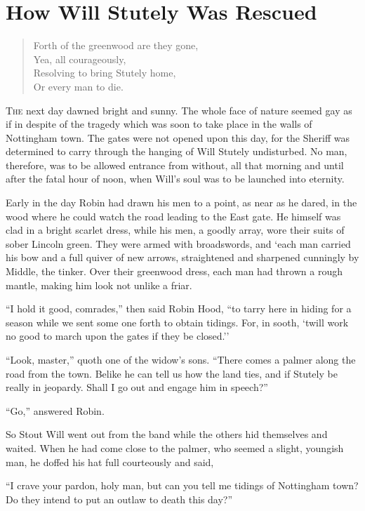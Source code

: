 \chapter{How Will Stutely Was Rescued}

\begin{quote}
Forth of the greenwood are they gone,\\
Yea, all courageously,\\
Resolving to bring Stutely home,\\
Or every man to die.
\end{quote}

\lettrine{T}{he} next day dawned bright and sunny. The whole face of nature seemed
gay as if in despite of the tragedy which was soon to take place in the
walls of Nottingham town. The gates were not opened upon this day, for
the Sheriff was determined to carry through the hanging of Will Stutely
undisturbed. No man, therefore, was to be allowed entrance from without,
all that morning and until after the fatal hour of noon, when Will's
soul was to be launched into eternity.

Early in the day Robin had drawn his men to a point, as near as he
dared, in the wood where he could watch the road leading to the East
gate. He himself was clad in a bright scarlet dress, while his men, a
goodly array, wore their suits of sober Lincoln green. They were armed
with broadswords, and `each man carried his bow and a full quiver of new
arrows, straightened and sharpened cunningly by Middle, the tinker. Over
their greenwood dress, each man had thrown a rough mantle, making him
look not unlike a friar.

``I hold it good, comrades,'' then said Robin Hood, ``to tarry here in
hiding for a season while we sent some one forth to obtain tidings. For,
in sooth, `twill work no good to march upon the gates if they be
closed.''

``Look, master,'' quoth one of the widow's sons. ``There comes a palmer
along the road from the town. Belike he can tell us how the land ties,
and if Stutely be really in jeopardy. Shall I go out and engage him in
speech?''

``Go,'' answered Robin.

So Stout Will went out from the band while the others hid themselves and
waited. When he had come close to the palmer, who seemed a slight,
youngish man, he doffed his hat full courteously and said,

``I crave your pardon, holy man, but can you tell me tidings of
Nottingham town? Do they intend to put an outlaw to death this day?''

